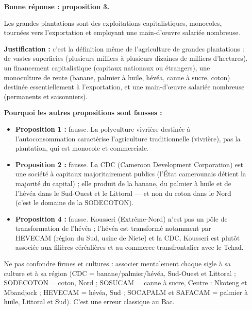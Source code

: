 \documentclass[11pt]{article}
\newcommand{\cle}[1]{{\popxbold\color{popdark}#1}}
\begin{document}
\begin{corrige}
\textbf{Bonne réponse : proposition 3.}

\og Les grandes plantations sont des exploitations capitalistiques, monocoles, tournées vers l'exportation et employant une main-d'œuvre salariée nombreuse. \fg

\textbf{Justification :} c'est la définition même de l'agriculture de grandes plantations : de vastes superficies (plusieurs milliers à plusieurs dizaines de milliers d'hectares), un financement capitalistique (capitaux nationaux ou étrangers), une monoculture de rente (banane, palmier à huile, hévéa, canne à sucre, coton) destinée essentiellement à l'exportation, et une main-d'œuvre salariée nombreuse (permanents et saisonniers).

\textbf{Pourquoi les autres propositions sont fausses :}
\begin{itemize}
\item \textbf{Proposition 1 :} fausse. La polyculture vivrière destinée à l'autoconsommation caractérise l'agriculture traditionnelle (vivrière), pas la plantation, qui est monocole et commerciale.
\item \textbf{Proposition 2 :} fausse. La CDC (Cameroon Development Corporation) est une société à capitaux majoritairement publics (l'État camerounais détient la majorité du capital) ; elle produit de la banane, du palmier à huile et de l'hévéa dans le Sud-Ouest et le Littoral — et non du coton dans le Nord (c'est le domaine de la SODECOTON).
\item \textbf{Proposition 4 :} fausse. Kousseri (Extrême-Nord) n'est pas un pôle de transformation de l'hévéa ; l'hévéa est transformé notamment par HEVECAM (région du Sud, usine de Niete) et la CDC. Kousseri est plutôt associée aux filières céréalières et au commerce transfrontalier avec le Tchad.
\end{itemize}
\end{corrige}

\begin{attention}
Ne pas confondre \cle{firmes} et \cle{cultures} : associer mentalement chaque sigle à sa culture et à sa région (CDC = banane/palmier/hévéa, Sud-Ouest et Littoral ; SODECOTON = coton, Nord ; SOSUCAM = canne à sucre, Centre : Nkoteng et Mbandjock ; HEVECAM = hévéa, Sud ; SOCAPALM et SAFACAM = palmier à huile, Littoral et Sud). C'est une erreur classique au Bac.
\end{attention}
\end{document}
